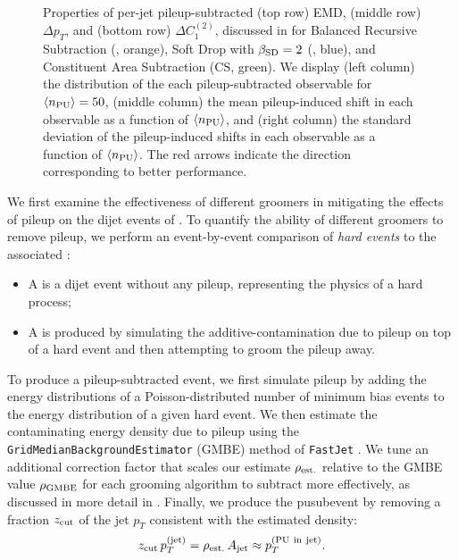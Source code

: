 \begin{figure}[p]
{    Properties of per-jet \gls{pileup}-subtracted (top row) EMD, (middle row) \(\Delta p_T\), and (bottom row) \(\Delta C_1^{(2)}\), discussed in  for Balanced Recursive Subtraction (, orange), Soft Drop with \(\beta_{\rm SD} = 2\) (, blue), and Constituent Area Subtraction (CS, green).
    We display (left column) the distribution of the each \gls{pileup}-subtracted observable for \(\langle n_{\rm PU}\rangle = 50\), (middle column) the mean \gls{pileup}-induced shift in each observable as a function of \(\langle n_{\rm PU}\rangle\), and (right column) the standard deviation of the \gls{pileup}-induced shifts in each observable as a function of \(\langle n_{\rm PU}\rangle\).
    The red arrows indicate the direction corresponding to better performance.
}
\label{fig:pu_response}
\centering
\end{figure}

We first examine the effectiveness of different groomers in mitigating the effects of \gls{pileup} on the dijet events of .
%
To quantify the ability of different groomers to remove \gls{pileup}, we perform an event-by-event comparison of \textit{hard events} to the associated :
\begin{itemize}
    \item
    A  is a dijet event without any \gls{pileup}, representing the physics of a hard process;

    \item
    A  is produced by simulating the \gls{additive-contamination} due to \gls{pileup} on top of a hard event and then attempting to groom the \gls{pileup} away.
\end{itemize}
%
To produce a \gls{pileup}-subtracted event, we first simulate \gls{pileup} by adding the energy distributions of a Poisson-distributed number of minimum bias events to the energy distribution of a given hard event.
    We then estimate the contaminating energy density due to \gls{pileup} using the \texttt{GridMedianBackgroundEstimator} (GMBE) method of \texttt{FastJet} \cite{Cacciari:2011ma}.
    We tune an additional correction factor that scales our estimate \(\rho_{\rm est.}\) relative to the GMBE value \(\rho_{\rm GMBE}\) for each grooming algorithm to subtract  more effectively, as discussed in more detail in .
    Finally, we produce the \gls{pusubevent} by removing a fraction \(z_{\rm cut}\) of the jet \(p_T\) consistent with the estimated  density:
\begin{align}
   z_{\rm cut}\,p_T^{\rm(jet)}
   =
   \rho_{\rm est.}\,A_{\rm jet}
   \approx
   p_T^{\rm(PU~in~jet)}
   .
\end{align}


